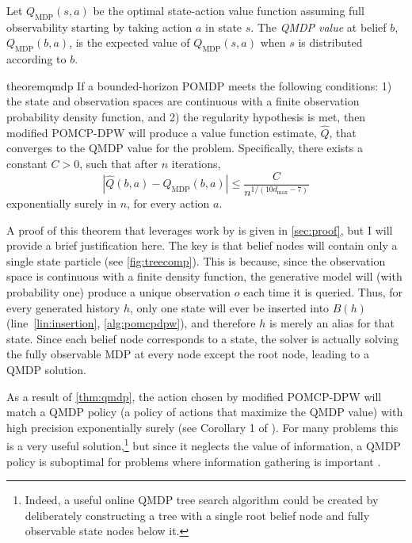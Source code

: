 \begin{definition}
    Let $Q_\text{MDP}(s,a)$ be the optimal state-action value function assuming full observability starting by taking action $a$ in state $s$. The \emph{QMDP value} at belief $b$, $Q_\text{MDP}(b,a)$, is the expected value of $Q_\text{MDP}(s,a)$ when $s$ is distributed according to $b$.
\end{definition}

\begin{restatable}{theorem}{qmdp}
    \label{thm:qmdp}
If a bounded-horizon POMDP meets the following conditions: 1) the state and observation spaces are continuous with a finite observation probability density function, and 2) the regularity hypothesis is met, then modified POMCP-DPW will produce a value function estimate, $\hat{Q}$, that converges to the QMDP value for the problem.
Specifically, there exists a constant $C>0$, such that after $n$ iterations,
\begin{equation*}
    \left| \hat{Q}(b,a) - Q_\text{MDP}(b,a) \right| \leq \frac{C}{n^{1/(10d_{\max}-7)}}
\end{equation*}
exponentially surely in $n$, for every action $a$.
\end{restatable}

A proof of this theorem that leverages work by \citet{auger2013continuous} is given in \cref{sec:proof}, but I will provide a brief justification here.
The key is that belief nodes will contain only a single state particle (see \cref{fig:treecomp}).
This is because, since the observation space is continuous with a finite density function, the generative model will (with probability one) produce a unique observation $o$ each time it is queried.
Thus, for every generated history $h$, only one state will ever be inserted into $B(h)$ (line~\ref{lin:insertion}, \cref{alg:pomcpdpw}), and therefore $h$ is merely an alias for that state. 
Since each belief node corresponds to a state, the solver is actually solving the fully observable MDP at every node except the root node, leading to a QMDP solution.

As a result of \cref{thm:qmdp}, the action chosen by modified POMCP-DPW will match a QMDP policy (a policy of actions that maximize the QMDP value) with high precision exponentially surely (see Corollary 1 of \citet{auger2013continuous}).
For many problems this is a very useful solution,\footnote{Indeed, a useful online QMDP tree search algorithm could be created by deliberately constructing a tree with a single root belief node and fully observable state nodes below it.} but since it neglects the value of information, a QMDP policy is suboptimal for problems where information gathering is important \cite{littman1995learning,kochenderfer2015decision}.

